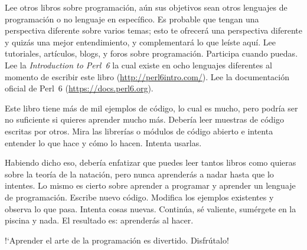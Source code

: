 Lee otros libros sobre programación, aún sus objetivos sean
otros lenguajes de programación o no lenguaje en específico.
Es probable que tengan una perspectiva diferente sobre varios
temas; esto te ofrecerá una perspectiva diferente y quizás una
mejor entendimiento, y complementará lo que leíste aquí.
Lee tutoriales, artículos, blogs, y foros sobre programación.
Participa cuando puedas. Lee la \emph{Introduction to Perl~6}
la cual existe en ocho lenguajes diferentes al momento de
escribir este libro (\url{http://perl6intro.com/}). Lee la
documentación oficial de Perl~6 (\url{https://docs.perl6.org}).

Este libro tiene más de mil ejemplos de código, lo cual es mucho,
pero podría ser no suficiente si quieres aprender mucho más.
Debería leer muestras de código escritas por otros. Mira las 
librerías o módulos de código abierto e intenta entender lo que 
hace y cómo lo hacen. Intenta usarlas.

Habiendo dicho eso, debería enfatizar que puedes leer tantos libros
como quieras sobre la teoría de la natación, pero nunca aprenderás
a nadar hasta que lo intentes. Lo mismo es cierto sobre aprender 
a programar y aprender un lenguaje de programación. Escribe nuevo
código. Modifica los ejemplos existentes y observa lo que pasa. 
Intenta cosas nuevas. Continúa, sé valiente, sumérgete en la piscina
y nada. El resultado es:  aprenderás al hacer.

!`Aprender el arte de la programación es divertido. Disfrútalo!

